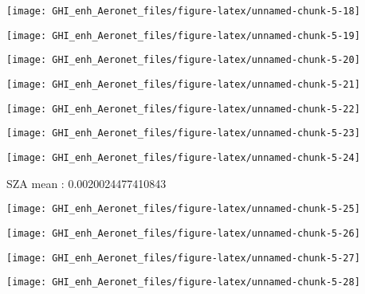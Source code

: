 \documentclass[
  10pt,
  a4paper,oneside]{article}
\begin{document}
\begin{center}\texttt{[image: GHI\_enh\_Aeronet\_files/figure-latex/unnamed-chunk-5-18]} \end{center}

\begin{center}\texttt{[image: GHI\_enh\_Aeronet\_files/figure-latex/unnamed-chunk-5-19]} \end{center}

\begin{center}\texttt{[image: GHI\_enh\_Aeronet\_files/figure-latex/unnamed-chunk-5-20]} \end{center}

\begin{center}\texttt{[image: GHI\_enh\_Aeronet\_files/figure-latex/unnamed-chunk-5-21]} \end{center}

\begin{center}\texttt{[image: GHI\_enh\_Aeronet\_files/figure-latex/unnamed-chunk-5-22]} \end{center}

\begin{center}\texttt{[image: GHI\_enh\_Aeronet\_files/figure-latex/unnamed-chunk-5-23]} \end{center}

\begin{center}\texttt{[image: GHI\_enh\_Aeronet\_files/figure-latex/unnamed-chunk-5-24]} \end{center}

SZA mean : 0.0020024477410843

\begin{center}\texttt{[image: GHI\_enh\_Aeronet\_files/figure-latex/unnamed-chunk-5-25]} \end{center}

\begin{center}\texttt{[image: GHI\_enh\_Aeronet\_files/figure-latex/unnamed-chunk-5-26]} \end{center}

\begin{center}\texttt{[image: GHI\_enh\_Aeronet\_files/figure-latex/unnamed-chunk-5-27]} \end{center}

\begin{center}\texttt{[image: GHI\_enh\_Aeronet\_files/figure-latex/unnamed-chunk-5-28]} \end{center}
\end{document}
